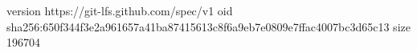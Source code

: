 version https://git-lfs.github.com/spec/v1
oid sha256:650f344f3e2a961657a41ba87415613c8f6a9eb7e0809e7ffac4007bc3d65c13
size 196704
